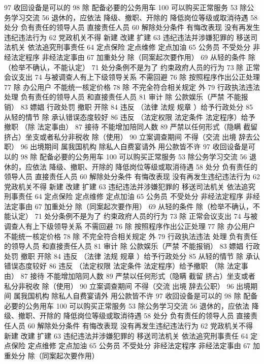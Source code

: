 \documentclass[cyan]{elegantnote}
\begin{document}
97 收回设备是可以的
98 除 配备必要的公务用车
100 可以购买正常服务
53 除公务学习交流
56 退休的，应依法
降级、撤职、开除的 降低岗位等级或取消待遇
58 处分
负有责任的领导人员
直接责任人员
60 解除处分条件
有悔改表现
没有再发生违纪违法行为
62 党政机关不得
新建 改建 扩建
63 违纪违法并涉嫌犯罪的
移送司法机关
依法追究刑事责任
64 定点保险 定点维修 定点加油
65 公务员 不受处分
非经法定程序
非经法定事由
67 加重处分
除（同案起次要作用）
69 从轻的条件
除（检举不确认，不能认定）
71 处分条例不是为了
约束政府人员的行为
73 除 正常会议支出
74 与被调查人有上下级领导关系 不需回避
76 除 按照程序作出公正处理
77 除 办公用户
不能统一核定价格
78 除 不完全符合相关规定 外
79 行政执法违法 处理
负有责任的领导人员
和直接责任人员
81 审计
除 公款娱乐（严禁 不能报销）
83 嫖娼 行政处罚
撤职 开除
84 违反 （法律 法规 规章 ）给予行政处分
85 从轻的情节
除 承认错误态度较好
86 违反 （法定权限 法定条件 法定程序）给予撤职
（除 法定事由）
87 接待 不能增加陪同人数
89 严禁以任何形式（隐瞒 截留 挤占）坐支或者私分非税收
除（使用）
90 立案调查期间 不得（交流 出境 辞去公职）
96 出境期间 属我国机构 除私人自费宴请外 用公款皆不许
97 收回设备是可以的
98 除 配备必要的公务用车
100 可以购买正常服务
53 除公务学习交流
56 退休的，应依法
降级、撤职、开除的 降低岗位等级或取消待遇
58 处分
负有责任的领导人员
直接责任人员
60 解除处分条件
有悔改表现
没有再发生违纪违法行为
62 党政机关不得
新建 改建 扩建
63 违纪违法并涉嫌犯罪的
移送司法机关
依法追究刑事责任
64 定点保险 定点维修 定点加油
65 公务员 不受处分
非经法定程序
非经法定事由
67 加重处分
除（同案起次要作用）
69 从轻的条件
除（检举不确认，不能认定）
71 处分条例不是为了
约束政府人员的行为
73 除 正常会议支出
74 与被调查人有上下级领导关系 不需回避
76 除 按照程序作出公正处理
77 除 办公用户
不能统一核定价格
78 除 不完全符合相关规定 外
79 行政执法违法 处理
负有责任的领导人员
和直接责任人员
81 审计
除 公款娱乐（严禁 不能报销）
83 嫖娼 行政处罚
撤职 开除
84 违反 （法律 法规 规章 ）给予行政处分
85 从轻的情节
除 承认错误态度较好
86 违反 （法定权限 法定条件 法定程序）给予撤职
（除 法定事由）
87 接待 不能增加陪同人数
89 严禁以任何形式（隐瞒 截留 挤占）坐支或者私分非税收
除（使用）
90 立案调查期间 不得（交流 出境 辞去公职）
96 出境期间 属我国机构 除私人自费宴请外 用公款皆不许
97 收回设备是可以的
98 除 配备必要的公务用车
100 可以购买正常服务
53 除公务学习交流
56 退休的，应依法
降级、撤职、开除的 降低岗位等级或取消待遇
58 处分
负有责任的领导人员
直接责任人员
60 解除处分条件
有悔改表现
没有再发生违纪违法行为
62 党政机关不得
新建 改建 扩建
63 违纪违法并涉嫌犯罪的
移送司法机关
依法追究刑事责任
64 定点保险 定点维修 定点加油
65 公务员 不受处分
非经法定程序
非经法定事由
67 加重处分
除（同案起次要作用）
\end{document}
